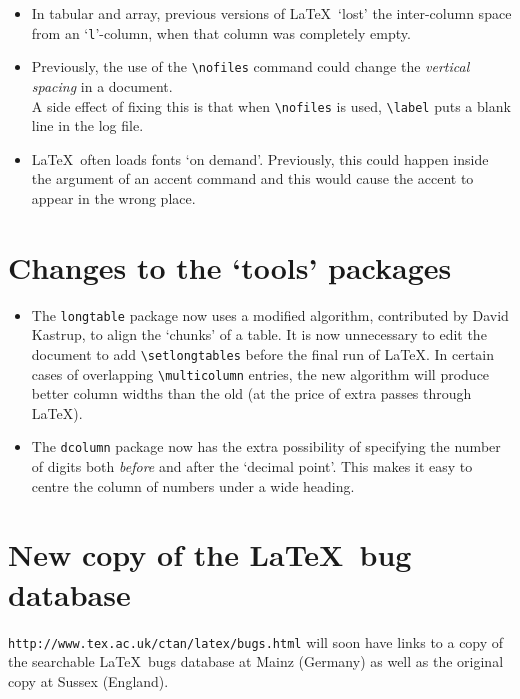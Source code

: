 \documentclass{ltnews}
\providecommand\pkg[1]{\texttt{#1}}
\begin{document}
\begin{itemize}
\item
  In tabular and array, previous versions of \LaTeX\ `lost' the
  inter-column space from an `\texttt{l}'-column, when that column
  was completely empty.

\item
  Previously, the use of the \verb|\nofiles| command could change
  the \emph{vertical spacing} in a document.\\ A side effect of fixing
  this is that when \verb|\nofiles| is used, \verb|\label| puts a
  blank line in the log file.

\item
  \LaTeX~often loads fonts `on demand'. Previously, this could
  happen inside the argument of an accent command and this would
  cause the accent to appear in the wrong place.

\end{itemize}

\section{Changes to the `tools' packages}

\begin{itemize}
\item
  The \pkg{longtable} package now uses a modified algorithm,
  contributed by David Kastrup, to align the `chunks' of a table.
  It is now unnecessary to edit the document to add
  \verb|\setlongtables| before the final run of \LaTeX.
  In certain cases of overlapping \verb|\multicolumn| entries, the new
  algorithm will produce better column widths than the old (at the
  price of extra passes through \LaTeX).

\item
  The \pkg{dcolumn} package now has the extra possibility of
  specifying the number of digits both \emph{before} and after the
  `decimal point'. This makes it easy to centre the column of numbers
  under a wide heading.
\end{itemize}

\section{New copy of the \LaTeX\ bug database}
\verb|http://www.tex.ac.uk/ctan/latex/bugs.html| will soon have links
to a copy of the searchable \LaTeX\ bugs database at Mainz (Germany)
as well as the original copy at Sussex (England).
\end{document}
